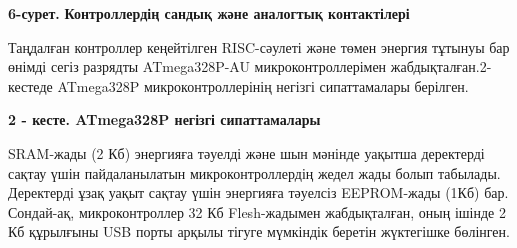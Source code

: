 {\bfseries 6-сурет.} {\bfseries Контроллердің сандық және аналогтық
контактілері}

Таңдалған контроллер кеңейтілген RISC-сәулеті және төмен энергия тұтынуы
бар өнімді сегіз разрядты ATmega328P-AU микроконтроллерімен
жабдықталған.2-кестеде ATmega328P микроконтроллерінің негізгі
сипаттамалары берілген.

{\bfseries 2 - кесте. ATmega328P негізгі сипаттамалары}


SRAM-жады (2 Кб) энергияға тәуелді және шын мәнінде уақытша деректерді
сақтау үшін пайдаланылатын микроконтроллердің жедел жады болып табылады.
Деректерді ұзақ уақыт сақтау үшін энергияға тәуелсіз EEPROM-жады (1Кб)
бар. Сондай-ақ, микроконтроллер 32 Кб Flesh-жадымен жабдықталған, оның
ішінде 2 Кб құрылғыны USB порты арқылы тігуге мүмкіндік беретін
жүктегішке бөлінген.

